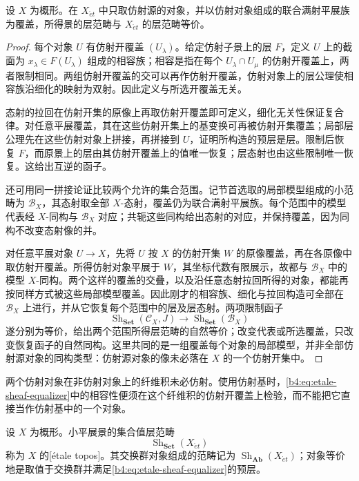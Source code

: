 \begin{proposition}\label{b4:prop:etale-affine-basis}
	设 \(X\) 为概形。在 \(X_{\acute{e}t}\) 中只取仿射源的对象，并以仿射对象组成的联合满射平展族为覆盖，所得景的层范畴与 \(X_{\acute{e}t}\) 的层范畴等价。
\end{proposition}
\begin{proof}
	每个对象 \(U\) 有仿射开覆盖 \((U_\lambda)\)。给定仿射子景上的层 \(F\)，定义 \(U\) 上的截面为 \(x_\lambda\in F(U_\lambda)\) 组成的相容族；相容是指在每个 \(U_\lambda\cap U_\mu\) 的仿射开覆盖上，两者限制相同。两组仿射开覆盖的交可以再作仿射开覆盖，仿射对象上的层公理使相容族沿细化的映射为双射。因此定义与所选开覆盖无关。

	态射的拉回在仿射开集的原像上再取仿射开覆盖即可定义，细化无关性保证复合律。对任意平展覆盖，其在这些仿射开集上的基变换可再被仿射开集覆盖；局部层公理先在这些仿射对象上拼接，再拼接到 \(U\)，证明所构造的预层是层。限制后恢复 \(F\)，而原景上的层由其仿射开覆盖上的值唯一恢复；层态射也由这些限制唯一恢复。这给出互逆的函子。

	还可用同一拼接论证比较两个允许的集合范围。记节首选取的局部模型组成的小范畴为 \(\mathcal B_X\)，其态射取全部 \(X\)-态射，覆盖仍为联合满射平展族。每个范围中的模型代表经 \(X\)-同构与 \(\mathcal B_X\) 对应；共轭这些同构给出态射的对应，并保持覆盖，因为同构不改变态射像的并。

	对任意平展对象 \(U\rightarrow X\)，先将 \(U\) 按 \(X\) 的仿射开集 \(W\) 的原像覆盖，再在各原像中取仿射开覆盖。所得仿射对象平展于 \(W\)，其坐标代数有限展示，故都与 \(\mathcal B_X\) 中的模型 \(X\)-同构。两个这样的覆盖的交叠，以及沿任意态射拉回所得的对象，都能再按同样方式被这些局部模型覆盖。因此刚才的相容族、细化与拉回构造可全部在 \(\mathcal B_X\) 上进行，并从它恢复每个范围中的层及层态射。两项限制函子
	\[
		\operatorname{Sh}_{\mathbf{Set}}(\mathcal C_X,J) \longrightarrow\operatorname{Sh}_{\mathbf{Set}}(\mathcal B_X)
	\]
	遂分别为等价，给出两个范围所得层范畴的自然等价；改变代表或所选覆盖，只改变恢复函子的自然同构。这里共同的是一组覆盖每个对象的局部模型，并非全部仿射源对象的同构类型：仿射源对象的像未必落在 \(X\) 的一个仿射开集中。
\end{proof}

两个仿射对象在非仿射对象上的纤维积未必仿射。使用仿射基时，\eqref{b4:eq:etale-sheaf-equalizer}中的相容性便须在这个纤维积的仿射开覆盖上检验，而不能把它直接当作仿射基中的一个对象。

\begin{definition}\label{b4:def:etale-topos}
	设 \(X\) 为概形。小平展景的集合值层范畴
	\[
		\operatorname{Sh}_{\mathbf{Set}}(X_{\acute{e}t})
	\]
	称为 \(X\) 的[étale topos]。其交换群对象组成的范畴记为 \(\operatorname{Sh}_{\mathbf{Ab}}(X_{\acute{e}t})\)；对象等价地是取值于交换群并满足\eqref{b4:eq:etale-sheaf-equalizer}的预层。
\end{definition}

